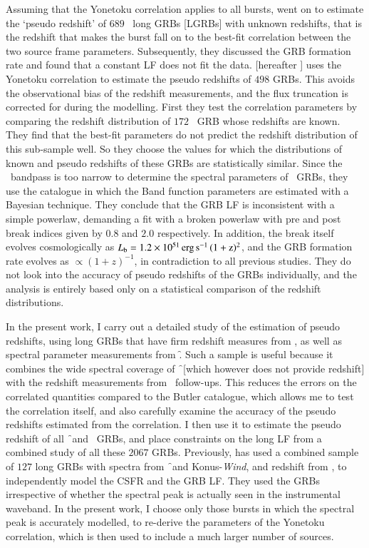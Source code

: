 Assuming that the Yonetoku correlation applies to all bursts,  went on to estimate the `pseudo redshift' of $689$ \B\ long GRBs [LGRBs] with unknown redshifts, that is the redshift that makes the burst fall on to the best-fit correlation between the two source frame parameters. Subsequently, they discussed the GRB formation rate and found that a constant LF does not fit the data. \cite{Tan_et_al.-2013-ApJL} [hereafter ] uses the Yonetoku correlation to estimate the pseudo redshifts of $498$ GRBs. This avoids the observational bias of the redshift measurements, and the flux truncation is corrected for during the modelling. First they test the correlation parameters by comparing the redshift distribution of $172$ \s\ GRB whose redshifts are known. They find that the best-fit parameters do not predict the redshift distribution of this sub-sample well. So they choose the values for which the distributions of known and pseudo redshifts of these GRBs are statistically similar. Since the \s\ bandpass is too narrow to determine the spectral parameters of \s\ GRBs, they use the \cite{Butler_et_al.-2007-ApJ} catalogue in which the Band function  parameters are estimated with a Bayesian technique. They conclude that the GRB LF is inconsistent with a simple powerlaw, demanding a fit with a broken powerlaw with pre and post break indices given by $0.8$ and $2.0$ respectively. In addition, the break itself evolves cosmologically as $L_{\rm{b}} = 1.2 \times 10^{51} \, \rm erg \, s^{-1} \, (1+z)^{2}$, and the GRB formation rate evolves as $\propto(1+z)^{-1}$, in contradiction to all previous studies. They do not look into the accuracy of pseudo redshifts of the GRBs individually, and the analysis is entirely based only on a statistical comparison of the redshift distributions.

In the present work, I carry out a detailed study of the estimation of pseudo redshifts, using long GRBs that have firm redshift measures from \s, as well as spectral parameter measurements from \f. Such a sample is useful because it combines the wide spectral coverage of \f\ [which however does not provide redshift] with the redshift measurements from \s\ follow-ups. This reduces the errors on the correlated quantities compared to the Butler catalogue, which allows me to test the correlation itself, and also carefully examine the accuracy of the pseudo redshifts estimated from the correlation. I then use it to estimate the pseudo redshift  of all \f\ and \s\ GRBs, and place constraints on the long LF from a combined study of all these $2067$ GRBs. Previously, \cite{Yu_et_al.-2015-ApJS} has used a combined sample of $127$ long GRBs with spectra from \f\ and Konus-\emph{Wind}, and redshift from \s, to independently model the CSFR and the GRB LF. They used the GRBs irrespective of whether the spectral peak is actually seen in the instrumental waveband. In the present work, I choose only those bursts in which the spectral peak is accurately modelled, to re-derive the parameters of the Yonetoku correlation, which is then used to include a much larger number of sources.

